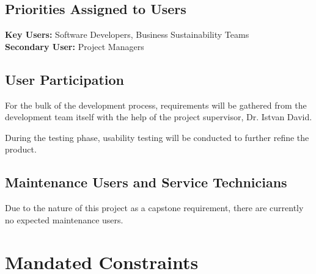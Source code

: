 \documentclass[12pt]{article}
\begin{document}
\subsection{Priorities Assigned to Users}
\textbf{Key Users:} Software Developers, Business Sustainability Teams \\
\textbf{Secondary User:} Project Managers

\subsection{User Participation}
For the bulk of the development process, requirements will be gathered from the development team itself with the help of the project supervisor, Dr. Istvan David.

During the testing phase, usability testing will be conducted to further refine the product.

\subsection{Maintenance Users and Service Technicians}
Due to the nature of this project as a capstone requirement, there are currently no expected maintenance users.

\section{Mandated Constraints}
\end{document}
